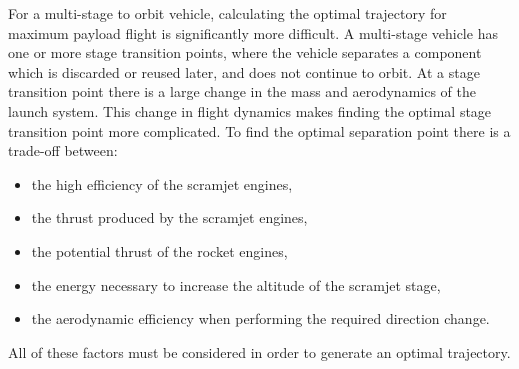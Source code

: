 For a multi-stage to orbit vehicle, calculating the optimal trajectory for maximum payload flight is significantly more difficult. A multi-stage vehicle has one or more stage transition points, where the vehicle separates a component which is discarded or reused later, and does not continue to orbit. At a stage transition point there is a large change in the mass and aerodynamics of the launch system. 
This change in flight dynamics makes finding the optimal stage transition point more complicated. To find the optimal separation point there is a trade-off between:
\begin{itemize}
	 \item the high efficiency of the scramjet engines,
	 \item the thrust produced by the scramjet engines,
	 \item the potential thrust of the rocket engines,
	 \item the energy necessary to increase the altitude of the scramjet stage,
	 \item the aerodynamic efficiency when performing the required direction change.
\end{itemize}
All of these factors must be considered in order to generate an optimal trajectory. 


